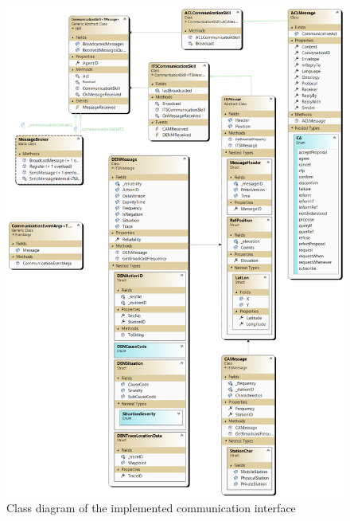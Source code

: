 \documentclass[main.tex]{subfiles}
\begin{document}
\begin{figure}[htbp]
    \centering
    \includegraphics[width=.99\textwidth]{mas-its-communication.png}
    \caption{Class diagram of the implemented communication interface}
    \label{fig-classes-comm}
\end{figure}
\end{document}
